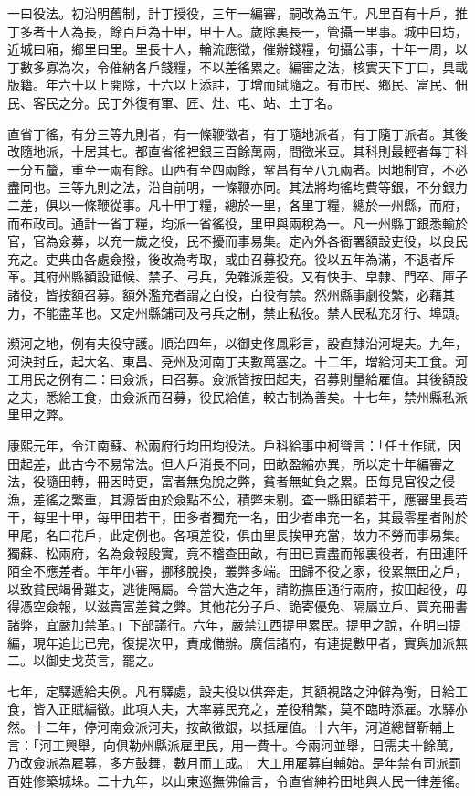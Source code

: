 \begin{pinyinscope}
一曰役法。初沿明舊制，計丁授役，三年一編審，嗣改為五年。凡里百有十戶，推丁多者十人為長，餘百戶為十甲，甲十人。歲除裏長一，管攝一里事。城中曰坊，近城曰廂，鄉里曰里。里長十人，輪流應徵，催辦錢糧，句攝公事，十年一周，以丁數多寡為次，令催納各戶錢糧，不以差徭累之。編審之法，核實天下丁口，具載版籍。年六十以上開除，十六以上添註，丁增而賦隨之。有市民、鄉民、富民、佃民、客民之分。民丁外復有軍、匠、灶、屯、站、土丁名。

直省丁徭，有分三等九則者，有一條鞭徵者，有丁隨地派者，有丁隨丁派者。其後改隨地派，十居其七。都直省徭裡銀三百餘萬兩，間徵米豆。其科則最輕者每丁科一分五釐，重至一兩有餘。山西有至四兩餘，鞏昌有至八九兩者。因地制宜，不必盡同也。三等九則之法，沿自前明，一條鞭亦同。其法將均徭均費等銀，不分銀力二差，俱以一條鞭從事。凡十甲丁糧，總於一里，各里丁糧，總於一州縣，而府，而布政司。通計一省丁糧，均派一省徭役，里甲與兩稅為一。凡一州縣丁銀悉輸於官，官為僉募，以充一歲之役，民不擾而事易集。定內外各衙署額設吏役，以良民充之。吏典由各處僉撥，後改為考取，或由召募投充。役以五年為滿，不退者斥革。其府州縣額設祗候、禁子、弓兵，免雜派差役。又有快手、皁隸、門卒、庫子諸役，皆按額召募。額外濫充者謂之白役，白役有禁。然州縣事劇役繁，必藉其力，不能盡革也。又定州縣鋪司及弓兵之制，禁止私役。禁人民私充牙行、埠頭。

瀕河之地，例有夫役守護。順治四年，以御史佟鳳彩言，設直隸沿河堤夫。九年，河決封丘，起大名、東昌、兗州及河南丁夫數萬塞之。十二年，增給河夫工食。河工用民之例有二：曰僉派，曰召募。僉派皆按田起夫，召募則量給雇值。其後額設之夫，悉給工食，由僉派而召募，役民給值，較古制為善矣。十七年，禁州縣私派里甲之弊。

康熙元年，令江南蘇、松兩府行均田均役法。戶科給事中柯聳言：「任土作賦，因田起差，此古今不易常法。但人戶消長不同，田畝盈縮亦異，所以定十年編審之法，役隨田轉，冊因時更，富者無兔脫之弊，貧者無虻負之累。臣每見官役之侵漁，差徭之繁重，其源皆由於僉點不公，積弊未剔。查一縣田額若干，應審里長若干，每里十甲，每甲田若干，田多者獨充一名，田少者串充一名，其最零星者附於甲尾，名曰花戶，此定例也。各項差役，俱由里長挨甲充當，故力不勞而事易集。獨蘇、松兩府，名為僉報殷實，竟不稽查田畝，有田已賣盡而報裏役者，有田連阡陌全不應差者。年年小審，挪移脫換，叢弊多端。田歸不役之家，役累無田之戶，以致貧民竭骨難支，逃徙隔屬。今當大造之年，請飭撫臣通行兩府，按田起役，毋得憑空僉報，以滋賣富差貧之弊。其他花分子戶、詭寄優免、隔屬立戶、買充冊書諸弊，宜嚴加禁革。」下部議行。六年，嚴禁江西提甲累民。提甲之說，在明曰提編，現年追比已完，復提次甲，責成備辦。廣信諸府，有連提數甲者，實與加派無二。以御史戈英言，罷之。

七年，定驛遞給夫例。凡有驛處，設夫役以供奔走，其額視路之沖僻為衡，日給工食，皆入正賦編徵。此項人夫，大率募民充之，差役稍繁，莫不臨時添雇。水驛亦然。十二年，停河南僉派河夫，按畝徵銀，以抵雇值。十六年，河道總督靳輔上言：「河工興舉，向俱勒州縣派雇里民，用一費十。今兩河並舉，日需夫十餘萬，乃改僉派為雇募，多方鼓舞，數月而工成。」大工用雇募自輔始。是年禁有司派罰百姓修築城垛。二十九年，以山東巡撫佛倫言，令直省紳衿田地與人民一律差徭。


\end{pinyinscope}
